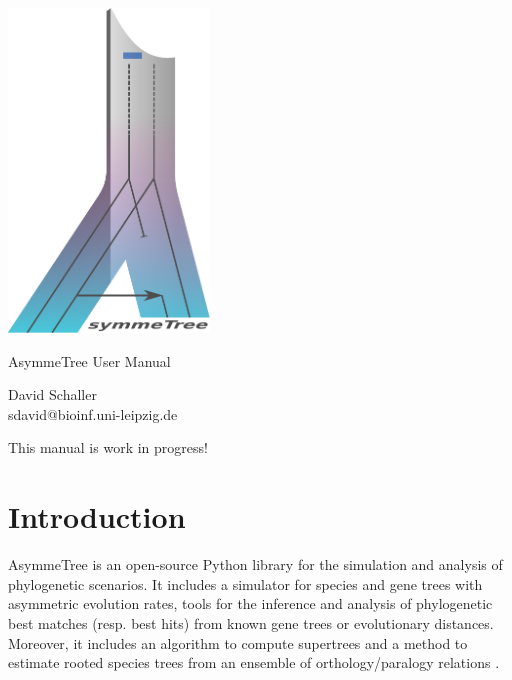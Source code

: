 \documentclass[hidelinks,11pt]{scrreprt}
\newcommand{\TODO}[1]{\begingroup\color{red}#1\endgroup}
\begin{document}
\begin{titlepage}
	\begin{center}
		\includegraphics[width=0.4\textwidth]{logo.pdf}
	\end{center}
	\begin{center}
		\vspace*{2cm}
		
		\Huge{
			AsymmeTree User Manual
		}

		\vspace{1.5cm}
		
		\LARGE
		David Schaller\\
		\vspace{1cm}
		\large
		sdavid@bioinf.uni-leipzig.de
		
		\vspace{2cm}
		\TODO{This manual is work in progress!}
		
	\end{center}
\end{titlepage}

\newpage

\tableofcontents

\chapter{Introduction}

AsymmeTree is an open-source Python library for the simulation and analysis of phylogenetic scenarios.
It includes a simulator for species and gene trees with asymmetric evolution rates, tools for the inference and analysis of phylogenetic best matches \citep{geiss2019a,geiss2020c} (resp. best hits) from known gene trees or evolutionary distances. Moreover, it includes an algorithm to compute supertrees \citep{deng2016} and a method to estimate rooted species trees from an ensemble of orthology/paralogy relations \citep{hellmuth2015}.
\end{document}
